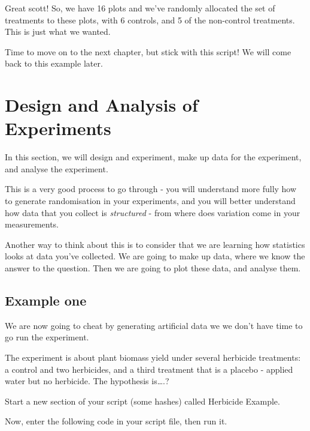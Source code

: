 \documentclass[
]{book}
\begin{document}
Great scott! So, we have 16 plots and we've randomly allocated the set of treatments to these plots, with 6 controls, and 5 of the non-control treatments. This is just what we wanted.

Time to move on to the next chapter, but stick with this script! We will come back to this example later.

\hypertarget{design-and-analysis-of-experiments}{%
\chapter{Design and Analysis of Experiments}\label{design-and-analysis-of-experiments}}

In this section, we will design and experiment, make up data for the experiment, and analyse the experiment.

This is a very good process to go through - you will understand more fully how to generate randomisation in your experiments, and you will better understand how data that you collect is \emph{structured} - from where does variation come in your measurements.

Another way to think about this is to consider that we are learning how statistics looks at data you've collected. We are going to make up data, where we know the answer to the question. Then we are going to plot these data, and analyse them.

\hypertarget{example-one}{%
\section{Example one}\label{example-one}}

We are now going to cheat by generating artificial data we we don't have time to go run the experiment.

The experiment is about plant biomass yield under several herbicide treatments: a control and two herbicides, and a third treatment that is a placebo - applied water but no herbicide. The hypothesis is\ldots.?

Start a new section of your script (some hashes) called Herbicide Example.

Now, enter the following code in your script file, then run it.
\end{document}
